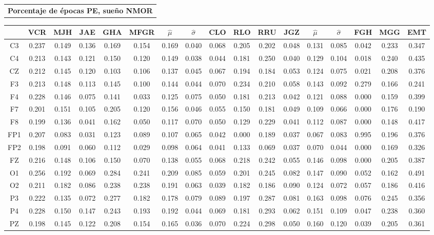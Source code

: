 \documentclass[12pt,a4paper]{mitthesis}
\begin{document}
\begin{SidewaysFigure}
\centering
\begin{tabular}{c}
\textbf{Porcentaje de \'epocas PE, sue\~no NMOR}
\vspace{1em}
\end{tabular}
\begin{tabular}{c||ccccc|cc||cccc|cc||ccc}
& VCR & MJH & JAE & GHA & MFGR &$\widehat{\mu}$ & $\widehat{\sigma}$
& CLO & RLO & RRU & JGZ &$\widehat{\mu}$ & $\widehat{\sigma}$
& FGH & MGG & EMT \\
\hline
C3&0.237&0.149&0.136&0.169&0.154&0.169&0.040&0.068&0.205&0.202&0.048&0.131&0.085&0.042&0.233&0.347 \\
C4&0.213&0.143&0.121&0.150&0.120&0.149&0.038&0.044&0.181&0.250&0.040&0.129&0.104&0.018&0.240&0.435 \\
CZ&0.212&0.145&0.120&0.103&0.106&0.137&0.045&0.067&0.194&0.184&0.053&0.124&0.075&0.021&0.208&0.376 \\
F3&0.213&0.148&0.113&0.145&0.100&0.144&0.044&0.070&0.234&0.210&0.058&0.143&0.092&0.279&0.166&0.241 \\
F4&0.228&0.146&0.075&0.141&0.033&0.125&0.075&0.050&0.181&0.213&0.042&0.121&0.088&0.000&0.159&0.399 \\
F7&0.201&0.151&0.105&0.205&0.120&0.156&0.046&0.055&0.150&0.181&0.049&0.109&0.066&0.000&0.176&0.190 \\
F8&0.199&0.136&0.041&0.162&0.050&0.117&0.070&0.050&0.129&0.229&0.041&0.112&0.087&0.000&0.148&0.417 \\
FP1&0.207&0.083&0.031&0.123&0.089&0.107&0.065&0.042&0.000&0.189&0.037&0.067&0.083&0.995&0.196&0.376 \\
FP2&0.198&0.091&0.060&0.112&0.029&0.098&0.064&0.041&0.133&0.069&0.037&0.070&0.044&0.000&0.169&0.326 \\
FZ&0.216&0.148&0.106&0.150&0.070&0.138&0.055&0.068&0.218&0.242&0.055&0.146&0.098&0.000&0.205&0.387 \\
O1&0.256&0.192&0.069&0.284&0.241&0.209&0.085&0.059&0.201&0.245&0.082&0.147&0.090&0.052&0.162&0.491 \\
O2&0.211&0.182&0.086&0.238&0.238&0.191&0.063&0.039&0.182&0.186&0.090&0.124&0.072&0.057&0.186&0.416 \\
P3&0.222&0.135&0.072&0.277&0.182&0.178&0.079&0.089&0.197&0.287&0.081&0.163&0.098&0.076&0.245&0.356 \\
P4&0.228&0.150&0.147&0.243&0.193&0.192&0.044&0.069&0.181&0.293&0.062&0.151&0.109&0.047&0.238&0.360 \\
PZ&0.198&0.145&0.122&0.208&0.154&0.165&0.036&0.070&0.224&0.298&0.050&0.160&0.120&0.039&0.205&0.361 \\

\end{tabular}
\end{SidewaysFigure}
\end{document}

